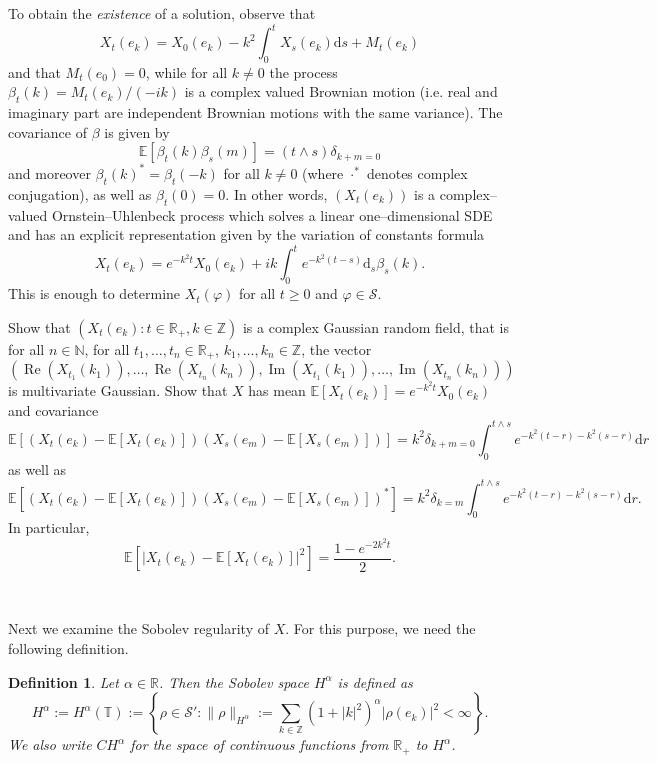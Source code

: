 \documentclass[a4paper,11pt]{article}
\newcommand{\assign}{:=}
\newcommand{\cdummy}{\cdot}
\newcommand{\mathd}{\mathrm{d}}
\newcommand{\tmop}[1]{\ensuremath{\operatorname{#1}}}
\newcommand{\tmtextit}[1]{{\itshape{#1}}}
\newtheorem{definition}{Definition}
{\theorembodyfont{\rmfamily}\newtheorem{example}{Example}}
{\theorembodyfont{\rmfamily\small}\newtheorem{exercise}{Exercise}}
\newcommand{\CS}{\mathscr{S}}
\begin{document}
To obtain the \tmtextit{existence} of a solution, observe that
\[ X_t (e_k) = X_0 (e_k) - k^2 \int_0^t X_s (e_k) \mathd s + M_t (e_k) \]
and that $M_t (e_0) = 0$, while for all $k \neq 0$ the process $\beta_t (k) =
M_t (e_k) / (- i k)$ is a complex valued Brownian motion (i.e. real and
imaginary part are independent Brownian motions with the same variance). The
covariance of $\beta$ is given by
\[ \mathbb{E} [\beta_t (k) \beta_s (m)] = (t \wedge s) \delta_{k + m = 0} \]
and moreover $\beta_t (k)^{\ast} = \beta_t (- k)$ for all $k \neq 0$ (where
$\cdummy^{\ast}$ denotes complex conjugation), as well as $\beta_t (0) = 0$.
In other words, $(X_t (e_k))$ is a complex--valued Ornstein--Uhlenbeck process
which solves a linear one--dimensional SDE and has an explicit representation
given by the variation of constants formula
\[ X_t (e_k) = e^{- k^2 t} X_0 (e_k) + i k \int_0^t e^{- k^2 (t - s)} \mathd_s
   \beta_s (k) . \]
This is enough to determine $X_t (\varphi)$ for all $t \geqslant 0$ and
$\varphi \in \CS$.

\begin{exercise}
  Show that $(X_t (e_k) : t \in \mathbb{R}_+, k \in \mathbb{Z})$ is a
  complex Gaussian random field, that is for all $n \in \mathbb{N}$, for all
  $t_1, \ldots, t_n \in \mathbb{R}_+$, $k_1, \ldots, k_n \in \mathbb{Z}$,
  the vector
  \[ (\tmop{Re} (X_{t_1} (k_1)), \ldots, \tmop{Re} (X_{t_n} (k_n)), \tmop{Im}
     (X_{t_1} (k_1)), \ldots, \tmop{Im} (X_{t_n} (k_n))) \]
  is multivariate Gaussian. Show that $X$ has mean $\mathbb{E} [X_t (e_k)] =
  e^{- k^2 t} X_0 (e_k)$ and covariance
  \[ \mathbb{E} [(X_t (e_k) -\mathbb{E} [X_t (e_k)]) (X_s (e_m) -\mathbb{E}
     [X_s (e_m)])] = k^2 \delta_{k + m = 0} \int_0^{t \wedge s} e^{- k^2 (t -
     r) - k^2 (s - r)} \mathd r \]
  as well as
  \[ \mathbb{E} [(X_t (e_k) -\mathbb{E} [X_t (e_k)]) (X_s (e_m) -\mathbb{E}
     [X_s (e_m)])^{\ast}] = k^2 \delta_{k = m} \int_0^{t \wedge s} e^{- k^2 (t
     - r) - k^2 (s - r)} \mathd r. \]
  In particular,
  \[ \mathbb{E} [| X_t (e_k) -\mathbb{E} [X_t (e_k)] |^2] = \frac{1 - e^{- 2
     k^2 t}}{2} . \]
\end{exercise}

\

Next we examine the Sobolev regularity of $X$. For this purpose, we need the
following definition.

\begin{definition}
  Let $\alpha \in \mathbb{R}$. Then the Sobolev space $H^{\alpha}$ is defined
  as
  \[ H^{\alpha} \assign H^{\alpha} (\mathbb{T}) \assign \left\{ \rho \in \CS'
     : \| \rho \|_{H^{\alpha}} \assign \sum_{k \in \mathbb{Z}} (1 + | k
     |^2)^{\alpha} | \rho (e_k) |^2 < \infty \right\} . \]
  We also write $C H^{\alpha}$ for the space of continuous functions from
  $\mathbb{R}_+$ to $H^{\alpha}$.
\end{definition}
\end{document}
